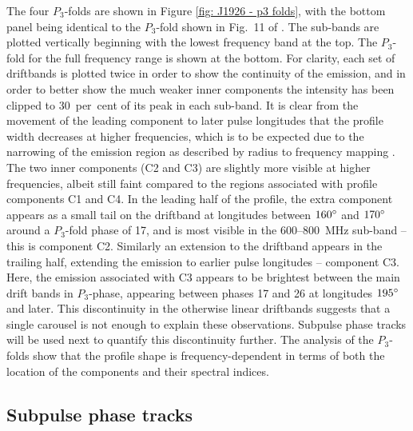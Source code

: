The four $P_3$-folds are shown in Figure \ref{fig: J1926 - p3 folds}, with the bottom panel being identical to the $P_3$-fold shown in Fig.~11 of \citet{ZLH+2019}. The sub-bands are plotted vertically beginning with the lowest frequency band at the top. The $P_3$-fold for the full frequency range is shown at the bottom. For clarity, each set of driftbands is plotted twice in order to show the continuity of the emission, and in order to better show the much weaker inner components the intensity has been clipped to 30~per~cent of its peak in each sub-band.  It is clear from the movement of the leading component to later pulse longitudes that the profile width decreases at higher frequencies, which is to be expected due to the narrowing of the emission region as described by radius to frequency mapping \citep[e.g.][]{Cxxx1978}. The two inner components (C2 and C3) are slightly more visible at higher frequencies, albeit still faint compared to the regions associated with profile components C1 and C4. In the leading half of the profile, the extra component appears as a small tail on the driftband at longitudes between $160^\circ$ and $170^\circ$ around a $P_3$-fold phase of 17, and is most visible in the 600--800~MHz sub-band -- this is component C2. Similarly an extension to the driftband appears in the trailing half, extending the emission to earlier pulse longitudes -- component C3. Here, the emission associated with C3 appears to be brightest between the main drift bands in $P_3$-phase, appearing between phases 17 and 26 at longitudes $195^\circ$ and later. This discontinuity in the otherwise linear driftbands suggests that a single carousel is not enough to explain these observations. Subpulse phase tracks will be used next to quantify this discontinuity further. The analysis of the $P_3$-folds show that the profile shape is frequency-dependent in terms of both the location of the components and their spectral indices.




\subsection{Subpulse phase tracks}
\label{sec: J1926 - analysis - phase tracks}

